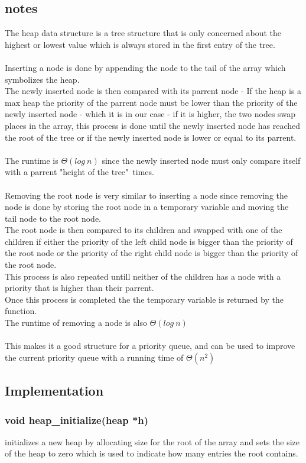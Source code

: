\documentclass[a4paper,12pt,danish]{report}
\begin{document}
\subsection{notes}
The heap data structure is a tree structure that is only concerned about the highest or lowest value which is always stored in the first entry of the tree.
\\
\\
Inserting a node is done by appending the node to the tail of the array which symbolizes the heap.
\\
The newly inserted node is then compared with its parrent node - If the heap is a max heap the priority of the parrent node must be lower than the priority of the newly inserted node - which it is in our case - if it is higher, the two nodes swap places in the array, this process is done until the newly inserted node has reached the root of the tree or if the newly inserted node is lower or equal to its parrent.
\\
\\
The runtime is $\Theta(log\ n)$ since the newly inserted node must only compare itself with a parrent "height of the tree"\ times.
\\
\\
Removing the root node is very similar to inserting a node since removing the node is done by storing the root node in a temporary variable and moving the tail node to the root node.
\\
The root node is then compared to its children and swapped with one of the children if either the priority of the left child node is bigger than the  priority of the root node or the priority of the right child node is bigger than the priority of the root node.
\\
This process is also repeated untill neither of the children has a node with a priority that is higher than their parrent.
\\
Once this process is completed the the temporary variable is returned by the function.
\\
The runtime of removing a node is also $\Theta(log\ n)$
\\
\\
This makes it a good structure for a priority queue, and can be used to improve the current priority queue with a running time of $\Theta(n^2)$
\subsection{Implementation}
\subsubsection{void heap\_initialize(heap *h)}
initializes a new heap by allocating size for the root of the array and sets the size of the heap to zero which is used to indicate how many entries the root contains.
\end{document}
